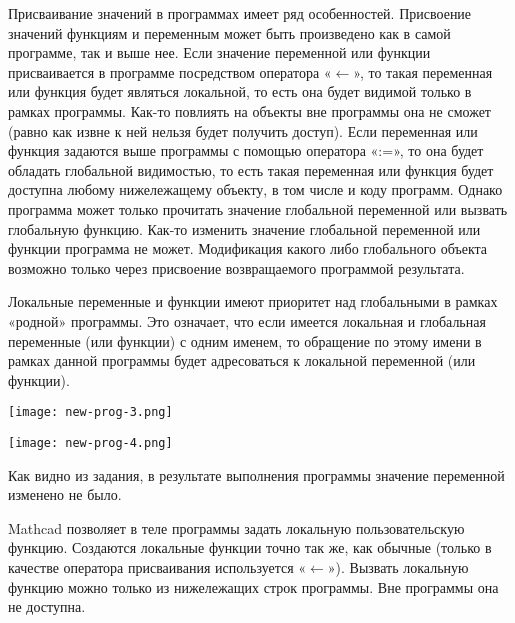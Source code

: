 Присваивание значений в программах имеет ряд особенностей. Присвоение значений функциям и переменным может быть произведено как в самой программе, так и выше нее. Если значение переменной или функции присваивается в программе посредством оператора «$\leftarrow$», то такая переменная или функция будет являться локальной, то есть она будет видимой только в рамках программы. Как-то повлиять на объекты вне программы она не сможет (равно как извне к ней нельзя будет получить доступ). Если переменная или функция задаются выше программы с помощью оператора «:=», то она будет обладать глобальной видимостью, то есть такая переменная или функция будет доступна любому нижележащему объекту, в том числе и коду программ. Однако программа может только прочитать значение глобальной переменной или вызвать глобальную функцию. Как-то изменить значение глобальной переменной или функции программа не может. Модификация какого либо глобального объекта возможно только через присвоение возвращаемого программой результата.

Локальные переменные и функции имеют приоритет над глобальными в рамках «родной» программы. Это означает, что если имеется локальная и глобальная переменные (или функции) с одним именем, то обращение по этому имени в рамках данной программы будет адресоваться к локальной переменной (или функции).


\begin{center}
	\texttt{[image: new-prog-3.png]}
\end{center}


\begin{center}
	\texttt{[image: new-prog-4.png]}
\end{center}

Как видно из задания, в результате выполнения программы значение переменной  изменено не было.

Mathcad позволяет в теле программы задать локальную пользовательскую функцию. Создаются локальные функции точно так же, как обычные (только в качестве оператора присваивания используется  «$\leftarrow$»). Вызвать локальную функцию можно только из нижележащих строк программы. Вне программы она не доступна.

